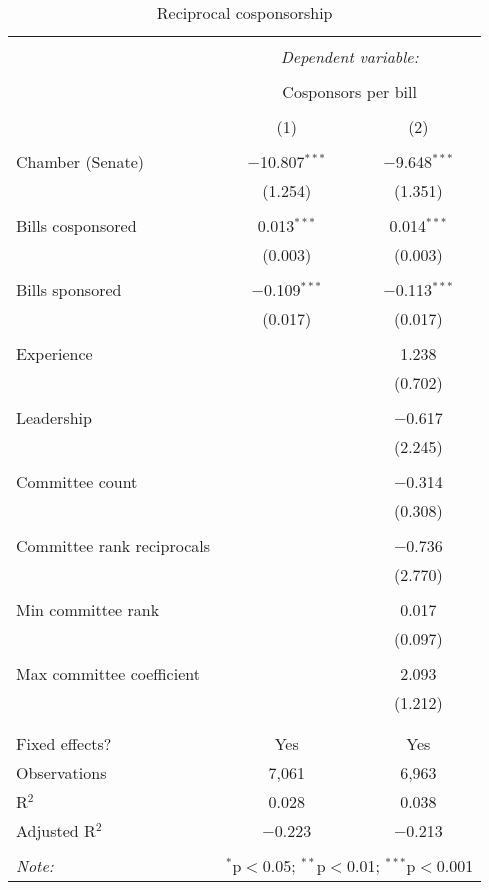 \documentclass{article}
\begin{document}
  \begin{table}[!htbp] \centering 
    \caption{Reciprocal cosponsorship} 
    \label{tab:reciprocal} 
  \begin{tabular}{@{\extracolsep{5pt}}lcc} 
  \\[-1.8ex]\hline 
  \hline \\[-1.8ex] 
   & \multicolumn{2}{c}{\textit{Dependent variable:}} \\ 
  \cline{2-3} 
  \\[-1.8ex] & \multicolumn{2}{c}{Cosponsors per bill} \\ 
  \\[-1.8ex] & (1) & (2)\\ 
  \hline \\[-1.8ex] 
   Chamber (Senate) & $-$10.807$^{***}$ & $-$9.648$^{***}$ \\ 
    & (1.254) & (1.351) \\ 
    & & \\ 
   Bills cosponsored & 0.013$^{***}$ & 0.014$^{***}$ \\ 
    & (0.003) & (0.003) \\ 
    & & \\ 
   Bills sponsored & $-$0.109$^{***}$ & $-$0.113$^{***}$ \\ 
    & (0.017) & (0.017) \\ 
    & & \\ 
   Experience &  & 1.238 \\ 
    &  & (0.702) \\ 
    & & \\ 
   Leadership &  & $-$0.617 \\ 
    &  & (2.245) \\ 
    & & \\ 
   Committee count &  & $-$0.314 \\ 
    &  & (0.308) \\ 
    & & \\ 
   Committee rank reciprocals &  & $-$0.736 \\ 
    &  & (2.770) \\ 
    & & \\ 
   Min committee rank &  & 0.017 \\ 
    &  & (0.097) \\ 
    & & \\ 
   Max committee coefficient &  & 2.093 \\ 
    &  & (1.212) \\ 
    & & \\ 
  \hline \\[-1.8ex] 
  Fixed effects? & Yes & Yes \\ 
  Observations & 7,061 & 6,963 \\ 
  R$^{2}$ & 0.028 & 0.038 \\ 
  Adjusted R$^{2}$ & $-$0.223 & $-$0.213 \\ 
  \hline 
  \hline \\[-1.8ex] 
  \textit{Note:}  & \multicolumn{2}{r}{$^{*}$p$<$0.05; $^{**}$p$<$0.01; $^{***}$p$<$0.001} \\ 
  \end{tabular} 
  \end{table} 
\end{document}
